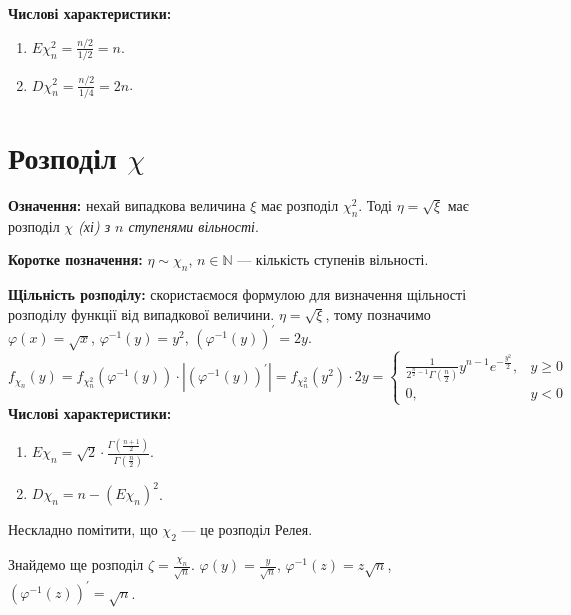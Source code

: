 \noindent\textbf{Числові характеристики:}
\begin{enumerate}
    \item $E\chi_n^2 = \frac{n/2}{1/2} = n$.
    \item $D\chi_n^2 = \frac{n/2}{1/4} = 2n$.
\end{enumerate}

\section{Розподіл \texorpdfstring{$\chi$}{x}}
\noindent\textbf{Означення:} нехай випадкова величина $\xi$ має розподіл $\chi_n^2$.
Тоді $\eta = \sqrt{\xi}$ має розподіл
\emph{$\chi$ (хі) з $n$ ступенями вільності}.

\noindent\textbf{Коротке позначення:} $\eta \sim \chi_n$, $n\in\mathbb{N}$ --- кількість ступенів вільності.

\noindent\textbf{Щільність розподілу:} скористаємося формулою для визначення щільності розподілу функції від
випадкової величини. $\eta = \sqrt{\xi}$, тому позначимо $\varphi(x) = \sqrt{x}$, $\varphi^{-1}(y) = y^2$,
$\left( \varphi^{-1}(y) \right)^{\prime} = 2y$.
\begin{equation*}
    f_{\chi_n}(y) = f_{\chi_n^2}\left(\varphi^{-1} (y)\right) \cdot \left|\left(\varphi^{-1} (y) \right)^{\prime}\right| =
f_{\chi_n^2}(y^2) \cdot 2y = 
\begin{cases}
    \frac{1}{2^{\frac{n}{2} - 1} \Gamma\left(\frac{n}{2}\right)} y^{n-1} e^{-\frac{y^2}{2}}, & y \geq 0 \\
    0, & y < 0
\end{cases}
\end{equation*}
\noindent\textbf{Числові характеристики:}
\begin{enumerate}
    \item $E\chi_n = \sqrt{2} \cdot \frac{\Gamma\left(\frac{n+1}{2}\right)}{\Gamma\left(\frac{n}{2}\right)}$.
    \item $D\chi_n = n - \left( E\chi_n \right)^2$.
\end{enumerate}

\begin{remark}
    Нескладно помітити, що $\chi_2$ --- це розподіл Релея.
\end{remark} 

\noindent Знайдемо ще розподіл $\zeta = \frac{\chi_n}{\sqrt{n}}$. $\varphi(y) = \frac{y}{\sqrt{n}}$,
$\varphi^{-1}(z) = z \sqrt{n}$, 
$\left( \varphi^{-1}(z) \right)^{\prime} = \sqrt{n}$.

